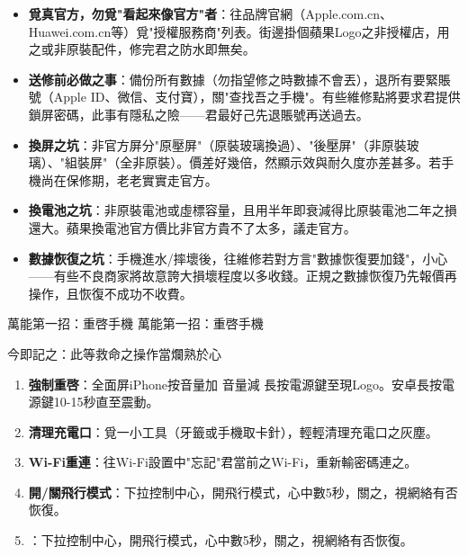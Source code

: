 \begin{itemize}
  \item \textbf{覓真官方，勿覓"看起來像官方"者}：往品牌官網（Apple.com.cn、Huawei.com.cn等）覓"授權服務商"列表。街邊掛個蘋果Logo之非授權店，用之或非原裝配件，修完君之防水即無矣。
  \item \textbf{送修前必做之事}：備份所有數據（勿指望修之時數據不會丟），退所有要緊賬號（Apple ID、微信、支付寶），關"查找吾之手機"。有些維修點將要求君提供鎖屏密碼，此事有隱私之險——君最好己先退賬號再送過去。
  \item \textbf{換屏之坑}：非官方屏分"原壓屏"（原裝玻璃換過）、"後壓屏"（非原裝玻璃）、"組裝屏"（全非原裝）。價差好幾倍，然顯示效與耐久度亦差甚多。若手機尚在保修期，老老實實走官方。
  \item \textbf{換電池之坑}：非原裝電池或虛標容量，且用半年即衰減得比原裝電池二年之損還大。蘋果換電池官方價比非官方貴不了太多，議走官方。
  \item \textbf{數據恢復之坑}：手機進水/摔壞後，往維修若對方言"數據恢復要加錢"，小心——有些不良商家將故意誇大損壞程度以多收錢。正規之數據恢復乃先報價再操作，且恢復不成功不收費。
\end{itemize}

\begin{tcbwarn}{萬能第一招：重啓手機}
萬能第一招：重啓手機

\end{tcbwarn}

\begin{tcbpractice}{今即記之：此等救命之操作當爛熟於心}
\begin{enumerate}
  \item \textbf{強制重啓}：全面屏iPhone按音量加 音量減 長按電源鍵至現Logo。安卓長按電源鍵10-15秒直至震動。
  \item \textbf{清理充電口}：覓一小工具（牙籤或手機取卡針），輕輕清理充電口之灰塵。
  \item \textbf{Wi-Fi重連}：往Wi-Fi設置中"忘記"君當前之Wi-Fi，重新輸密碼連之。
  \item \textbf{開/關飛行模式}：下拉控制中心，開飛行模式，心中數5秒，關之，視網絡有否恢復。
  \item ：下拉控制中心，開飛行模式，心中數5秒，關之，視網絡有否恢復。
\end{enumerate}

\end{tcbpractice}
